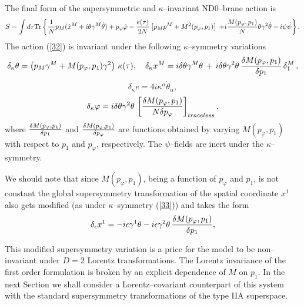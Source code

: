 \documentclass[a4paper,12pt]{article}
\newcommand{\nn}{\nonumber\\}\newcommand{\p}[1]{(\ref{#1})}
\begin{document}
The final form of the supersymmetric and $\kappa$--invariant
ND0--brane action is
\begin{equation}
\label{32}
S=\int d\tau {\rm Tr}\left\{{1\over N}p_M(\dot
x^M+i\theta\gamma^M\dot\theta)+p_\varphi\dot\varphi-{{e(\tau)}\over
2N}\left[p_Mp^M+M^2(p_\varphi,p_1)\right]\right. %
 \left.+i{M(p_\varphi,p_1)\over N}
\theta\gamma^2\dot\theta-i\psi\dot\psi \right\}.
\end{equation}
The action \p{32} is invariant under the following
$\kappa$--symmetry variations
\begin{equation}\label{33}
\delta_\kappa\theta=\left(p_M\gamma^M+M(p_\varphi,p_1)\gamma^2\right)\,\kappa(\tau),
\quad \delta_\kappa x^M=i\delta\theta\gamma^M\theta\,
+\,i\delta\theta\gamma^2\theta\,{{\delta
M(p_\varphi,p_1)}\over{\delta p_1}}\,\delta^M_1\,,
\end{equation}
$$
\delta_\kappa e=4i\kappa^\alpha\dot\theta_\alpha,
$$
\begin{equation}\label{kf}
\delta_\kappa\varphi=i\delta\theta\gamma^2\theta\,
\left[{{\delta M(p_\varphi,p_1)}\over{N\delta p_\varphi}}\right]_{traceless},
\end{equation}
where ${{\delta M(p_\varphi,p_1)}\over{\delta p_1}}$ and
${{\delta M(p_\varphi,p_1)}\over{\delta p_\varphi}}$ are
functions obtained by  varying  $M(p_\varphi,p_1)$ with
respect to $p_1$ and $p_\varphi$, respectively.
The $\psi$--fields are inert under the $\kappa$--symmetry.

We should note that since $M(p_\varphi,p_1)$, being a function
of $p_\varphi$ and $p_1$, is not constant the global supersymmetry
transformation of the spatial coordinate $x^1$ also gets modified (as under
$\kappa$--symmetry \p{33}) and
takes the form
\begin{equation}\label{x1}
\delta_\epsilon
x^1=-i\epsilon\gamma^1\theta-i\epsilon\gamma^2\theta\,{{\delta
M(p_\varphi,p_1)}\over{\delta p_1}},
\end{equation}


 This modified supersymmetry variation is
 a price for the model to be non--invariant under
$D=2$ Lorentz transformations. The Lorentz invariance of the first
order formulation is broken by an explicit dependence of $M$ on
$p_1$. In the next Section we shall consider a Lorentz--covariant counterpart
of this system with the standard
 supersymmetry transformations  of the type IIA superspace.
\end{document}
